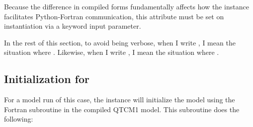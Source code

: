 Because the difference in compiled forms fundamentally affects how
the  instance facilitates Python-Fortran communication,
this attribute must be set on instantiation via a keyword input
parameter.

In the rest of this section, to avoid being verbose, when I
write , I mean the situation where
.
Likewise, when I
write , I mean the situation where
.


	\subsection{Initialization for 
			}
				\label{sec:init.compiledform.full}

For a model run of this case, the  instance will
initialize the model using the Fortran  subroutine
in the compiled QTCM1 model.  This subroutine does the following:

